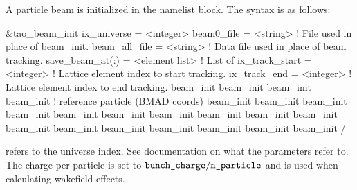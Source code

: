 {{{{{{{{{{{{A particle beam is initialized in the  namelist block.
The syntax is as follows:
\begin{example}
  &tao_beam_init
    ix_universe             = <integer>
    beam0_file              = <string>       ! File used in place of beam_init.
    beam_all_file           = <string>       ! Data file used in place of beam tracking.
    save_beam_at(:)         = <element list> ! List of 
    ix_track_start          = <integer>      ! Lattice element index to start tracking.
    ix_track_end            = <integer>      ! Lattice element index to end   tracking.
    beam_init%
    beam_init%
    beam_init%
    beam_init%
                                             ! reference particle (BMAD coords)
    beam_init%
    beam_init%
    beam_init%
    beam_init%
    beam_init%
    beam_init%
    beam_init%
    beam_init%
    beam_init%
    beam_init%
    beam_init%
    beam_init%
    beam_init%
    beam_init%
    beam_init%
    beam_init%
    beam_init%
  /
\end{example}
 refers to the universe index. See \bmad documentation on what
the  parameters refer to. The charge per particle is set to
$\vn{bunch_charge} / \vn{n_particle}$ and is used when calculating wakefield
effects.

}}}}}}}}}}}}
